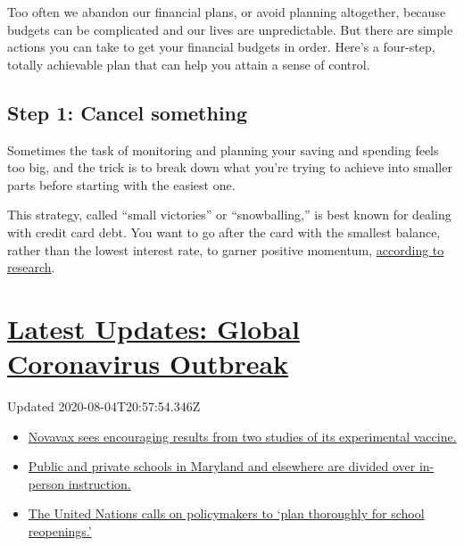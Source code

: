 Too often we abandon our financial plans, or avoid planning altogether,
because budgets can be complicated and our lives are unpredictable. But
there are simple actions you can take to get your financial budgets in
order. Here's a four-step, totally achievable plan that can help you
attain a sense of control.

\hypertarget{step-1-cancel-something}{%
\subsection{Step 1: Cancel something}\label{step-1-cancel-something}}

Sometimes the task of monitoring and planning your saving and spending
feels too big, and the trick is to break down what you're trying to
achieve into smaller parts before starting with the easiest one.

This strategy, called ``small victories'' or ``snowballing,'' is best
known for dealing with credit card debt. You want to go after the card
with the smallest balance, rather than the lowest interest rate, to
garner positive momentum,
\href{https://www.nber.org/papers/w20125.pdf}{according to research}.

\hypertarget{latest-updates-global-coronavirus-outbreak}{%
\section{\texorpdfstring{\href{https://www.nytimes.com/2020/08/04/world/coronavirus-cases.html?action=click\&pgtype=Article\&state=default\&region=MAIN_CONTENT_1\&context=storylines_live_updates}{Latest
Updates: Global Coronavirus
Outbreak}}{Latest Updates: Global Coronavirus Outbreak}}\label{latest-updates-global-coronavirus-outbreak}}

Updated 2020-08-04T20:57:54.346Z

\begin{itemize}
\tightlist
\item
  \href{https://www.nytimes.com/2020/08/04/world/coronavirus-cases.html?action=click\&pgtype=Article\&state=default\&region=MAIN_CONTENT_1\&context=storylines_live_updates\#link-1228a480}{Novavax
  sees encouraging results from two studies of its experimental
  vaccine.}
\item
  \href{https://www.nytimes.com/2020/08/04/world/coronavirus-cases.html?action=click\&pgtype=Article\&state=default\&region=MAIN_CONTENT_1\&context=storylines_live_updates\#link-4825b93}{Public
  and private schools in Maryland and elsewhere are divided over
  in-person instruction.}
\item
  \href{https://www.nytimes.com/2020/08/04/world/coronavirus-cases.html?action=click\&pgtype=Article\&state=default\&region=MAIN_CONTENT_1\&context=storylines_live_updates\#link-50f7386d}{The
  United Nations calls on policymakers to `plan thoroughly for school
  reopenings.'}
\end{itemize}


